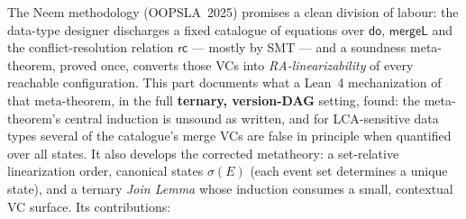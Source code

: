 \documentclass[11pt]{article}
\newcommand{\rcrel}{\mathsf{rc}}                 %
\newcommand{\mergeL}{\mathsf{mergeL}}
\begin{document}
The Neem methodology (OOPSLA~2025) promises a clean division of labour:
the data-type designer discharges a fixed catalogue of equations over
$\mathsf{do}$, $\mergeL$ and the conflict-resolution relation
$\rcrel$ --- mostly by SMT --- and a soundness meta-theorem, proved
once, converts those VCs into \emph{RA-linearizability} of every reachable
configuration. This part documents what a Lean~4 mechanization of that
meta-theorem, in the full \textbf{ternary, version-DAG} setting, found:
the meta-theorem's central induction is unsound as written, and for
LCA-sensitive data types several of the catalogue's merge VCs are false
in principle when quantified over all states. It also develops the
corrected metatheory: a set-relative linearization order, canonical
states $\sigma(E)$ (each event set determines a unique state), and a
ternary \emph{Join Lemma} whose induction
consumes a small, contextual VC surface. Its contributions:
\end{document}
